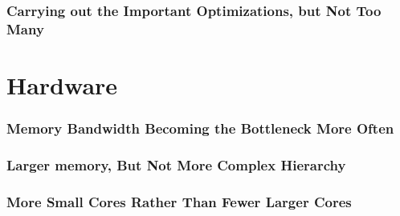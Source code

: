 \documentclass[11pt]{article}
\begin{document}
\subsubsection*{Carrying out the Important Optimizations, but Not Too Many}
\section{Hardware}
\subsubsection*{Memory Bandwidth Becoming the Bottleneck More Often}
\subsubsection*{Larger memory, But Not More Complex Hierarchy}
\subsubsection*{More Small Cores Rather Than Fewer Larger Cores}
\end{document}
